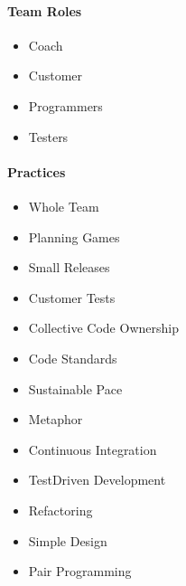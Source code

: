 \documentclass[letterpaper,10pt,english]{jupyterBook}
\begin{document}
\paragraph{Team Roles}
\label{\detokenize{APM/agile:id1}}\begin{itemize}
\item {} 
\sphinxAtStartPar
Coach

\item {} 
\sphinxAtStartPar
Customer

\item {} 
\sphinxAtStartPar
Programmers

\item {} 
\sphinxAtStartPar
Testers

\end{itemize}


\paragraph{Practices}
\label{\detokenize{APM/agile:practices}}\begin{itemize}
\item {} 
\sphinxAtStartPar
Whole Team

\item {} 
\sphinxAtStartPar
Planning Games

\item {} 
\sphinxAtStartPar
Small Releases

\item {} 
\sphinxAtStartPar
Customer Tests

\item {} 
\sphinxAtStartPar
Collective Code Ownership

\item {} 
\sphinxAtStartPar
Code Standards

\item {} 
\sphinxAtStartPar
Sustainable Pace

\item {} 
\sphinxAtStartPar
Metaphor

\item {} 
\sphinxAtStartPar
Continuous Integration

\item {} 
\sphinxAtStartPar
Test\sphinxhyphen{}Driven Development

\item {} 
\sphinxAtStartPar
Refactoring

\item {} 
\sphinxAtStartPar
Simple Design

\item {} 
\sphinxAtStartPar
Pair Programming

\end{itemize}
\end{document}
